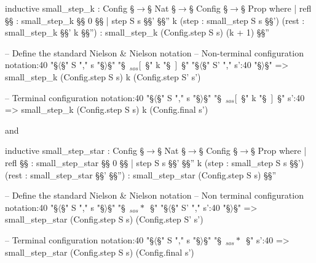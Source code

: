 \begin{Lean_Code}
inductive small_step_k : Config §\(\to\)§ Nat §\(\to\)§ Config §\(\to\)§ Prop where
  | refl {§\gamma§} :
      small_step_k §\gamma§ 0 §\gamma§
  | step {S s §\gamma§' §\gamma§'' k}
    (step : small_step S s §\gamma§')
    (rest : small_step_k §\gamma§' k §\gamma§'') :
      small_step_k (Config.step S s) (k + 1) §\gamma§''

-- Define the standard Nielson & Nielson notation
-- Non-terminal configuration
notation:40 "§\color{purple}$\langle$§" S "," s "§\color{purple}$\rangle$§"
  "§\ \color{purple}\to$_{sos}[$\ §" k "§\ \color{purple}$]$\ §" "§\color{purple}$\langle$§" S' "," s':40 "§\color{purple}$\rangle$§" =>
  small_step_k (Config.step S s) k (Config.step S' s')

-- Terminal configuration
notation:40 "§\color{purple}$\langle$§" S "," s "§\color{purple}$\rangle$§"
  "§\ \color{purple}\to$_{sos}[$\ §" k "§\ \color{purple}$]$\ §" s':40 =>
  small_step_k (Config.step S s) k (Config.final s')

\end{Lean_Code}
and
\begin{Lean_Code}
inductive small_step_star : Config §\(\to\)§ Nat §\(\to\)§ Config §\(\to\)§ Prop where
  | refl {§\gamma§} :
      small_step_star §\gamma§ 0 §\gamma§
  | step {S s §\gamma§' §\gamma§'' k}
    (step : small_step S s §\gamma§')
    (rest : small_step_star §\gamma§' §\gamma§'') :
      small_step_star (Config.step S s) §\gamma§''

-- Define the standard Nielson & Nielson notation
-- Non terminal configuration
notation:40 "§\color{purple}$\langle$§" S "," s "§\color{purple}$\rangle$§"
  "§\ \color{purple}\to$_{sos}*$\ §" "§\color{purple}$\langle$§" S' "," s':40 "§\color{purple}$\rangle$§" =>
  small_step_star (Config.step S s) (Config.step S' s')

-- Terminal configuration
notation:40 "§\color{purple}$\langle$§" S "," s "§\color{purple}$\rangle$§"
  "§\ \color{purple}\to$_{sos}*$\ §" s':40 =>
  small_step_star (Config.step S s) (Config.final s')

\end{Lean_Code}

